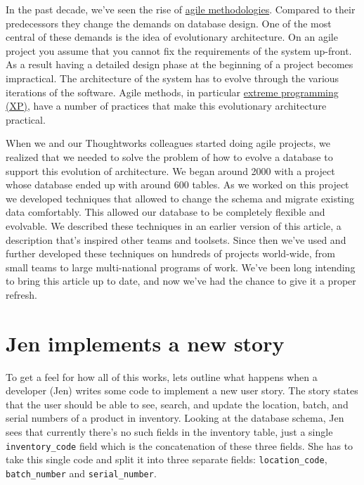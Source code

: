 \documentclass[12pt]{article}
\begin{document}
In the past decade, we've seen the rise of
\href{https://martinfowler.com/articles/newMethodology.html}{agile
methodologies}. Compared to their predecessors they change the demands
on database design. One of the most central of these demands is the idea
of evolutionary architecture. On an agile project you assume that you
cannot fix the requirements of the system up-front. As a result having a
detailed design phase at the beginning of a project becomes impractical.
The architecture of the system has to evolve through the various
iterations of the software. Agile methods, in particular
\href{https://martinfowler.com/articles/newMethodology.html#XpextremeProgramming}{extreme
programming (XP)}, have a number of practices that make this
evolutionary architecture practical.

When we and our Thoughtworks colleagues started doing agile projects, we
realized that we needed to solve the problem of how to evolve a database
to support this evolution of architecture. We began around 2000 with a
project whose database ended up with around 600 tables. As we worked on
this project we developed techniques that allowed to change the schema
and migrate existing data comfortably. This allowed our database to be
completely flexible and evolvable. We described these techniques in an
earlier version of this article, a description that's inspired other
teams and toolsets. Since then we've used and further developed these
techniques on hundreds of projects world-wide, from small teams to large
multi-national programs of work. We've been long intending to bring this
article up to date, and now we've had the chance to give it a proper
refresh.

\newpage

\section{Jen implements a new story}

To get a feel for how all of this works, lets outline what happens when
a developer (Jen) writes some code to implement a new user story. The
story states that the user should be able to see, search, and update the
location, batch, and serial numbers of a product in inventory. Looking
at the database schema, Jen sees that currently there's no such fields
in the inventory table, just a single \verb=inventory_code= field which
is the concatenation of these three fields. She has to take this single
code and split it into three separate fields: \verb=location_code=,
\verb=batch_number= and \verb=serial_number=.
\end{document}
